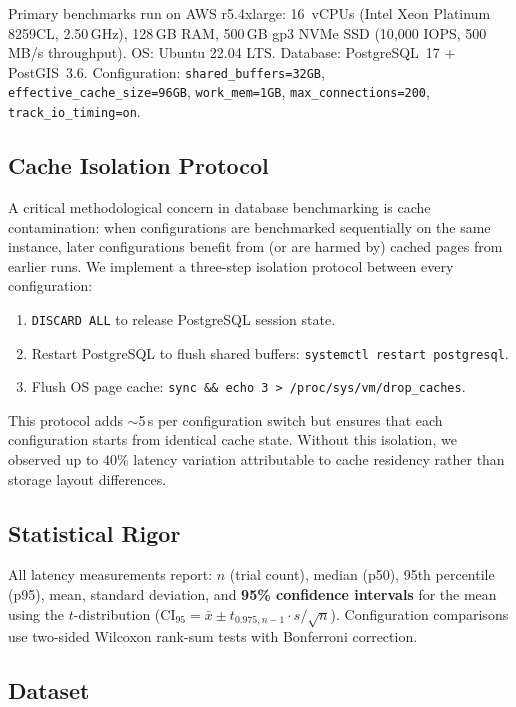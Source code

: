 \documentclass[sigconf]{acmart}
\begin{document}
Primary benchmarks run on AWS r5.4xlarge:
16~vCPUs (Intel Xeon Platinum 8259CL, 2.50\,GHz),
128\,GB RAM,
500\,GB gp3 NVMe SSD (10{,}000 IOPS, 500\,MB/s throughput).
OS: Ubuntu 22.04 LTS.
Database: PostgreSQL~17 + PostGIS~3.6.
Configuration: \texttt{shared\_buffers=32GB}, \texttt{effective\_cache\_size=96GB}, \texttt{work\_mem=1GB}, \texttt{max\_connections=200}, \texttt{track\_io\_timing=on}.

\subsection{Cache Isolation Protocol}
\label{sec:cache_isolation}

A critical methodological concern in database benchmarking is cache contamination: when configurations are benchmarked sequentially on the same instance, later configurations benefit from (or are harmed by) cached pages from earlier runs.
We implement a three-step isolation protocol between every configuration:

\begin{enumerate}
\item \texttt{DISCARD ALL} to release PostgreSQL session state.
\item Restart PostgreSQL to flush shared buffers: \texttt{systemctl restart postgresql}.
\item Flush OS page cache: \texttt{sync \&\& echo 3 > /proc/sys/vm/drop\_caches}.
\end{enumerate}

This protocol adds $\sim$5\,s per configuration switch but ensures that each configuration starts from identical cache state.
Without this isolation, we observed up to $40\%$ latency variation attributable to cache residency rather than storage layout differences.

\subsection{Statistical Rigor}

All latency measurements report:
$n$ (trial count), median (p50), 95th percentile (p95), mean, standard deviation, and \textbf{95\% confidence intervals} for the mean using the $t$-distribution ($\text{CI}_{95} = \bar{x} \pm t_{0.975, n-1} \cdot s/\sqrt{n}$).
Configuration comparisons use two-sided Wilcoxon rank-sum tests with Bonferroni correction.

\subsection{Dataset}
\label{sec:dataset}
\end{document}
